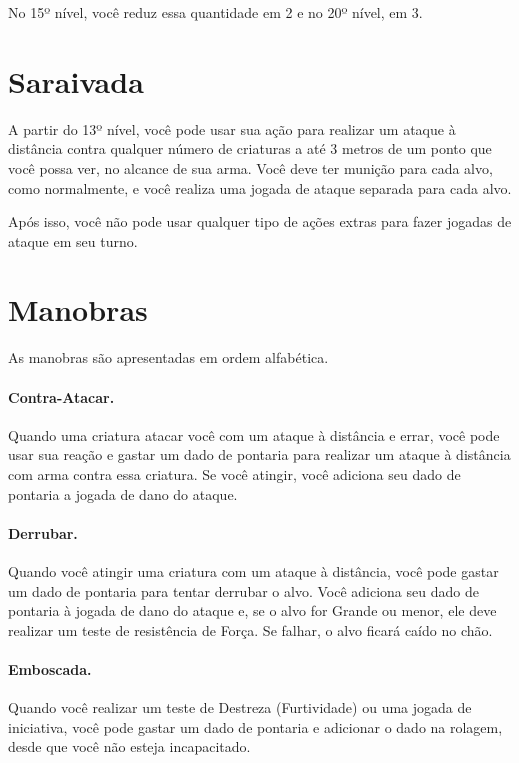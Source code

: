 \documentclass{RPG_Adventure}[2021/10/20]
\begin{document}
\begin{multicols}{2}
No 15º nível, você reduz essa quantidade em 2 e no 20º nível, em 3.


\section*{Saraivada}%

A partir do 13º nível, você pode usar sua ação para realizar um ataque à
distância contra qualquer número de criaturas a até 3 metros de um ponto que
você possa ver, no alcance de sua arma. Você deve ter munição para cada alvo,
como normalmente, e você realiza uma jogada de ataque separada para cada alvo.

Após isso, você não pode usar qualquer tipo de ações extras para fazer jogadas
de ataque em seu turno.

\section*{Manobras}%

As manobras são apresentadas em ordem alfabética.

\paragraph{Contra-Atacar.}%

Quando uma criatura atacar você com um ataque à distância e errar, você pode
usar sua reação e gastar um dado de pontaria para realizar um ataque à distância
com arma contra essa criatura. Se você atingir, você adiciona seu dado de
pontaria a jogada de dano do ataque.

\paragraph{Derrubar.}%

Quando você atingir uma criatura com um ataque à distância, você pode gastar um
dado de pontaria para tentar derrubar o alvo. Você adiciona seu dado de pontaria
à jogada de dano do ataque e, se o alvo for Grande ou menor, ele deve realizar
um teste de resistência de Força. Se falhar, o alvo ficará caído no chão.

\paragraph{Emboscada.}%

Quando você realizar um teste de Destreza (Furtividade) ou uma jogada de
iniciativa, você pode gastar um dado de pontaria e adicionar o dado na rolagem,
desde que você não esteja incapacitado.


\end{multicols}
\end{document}
